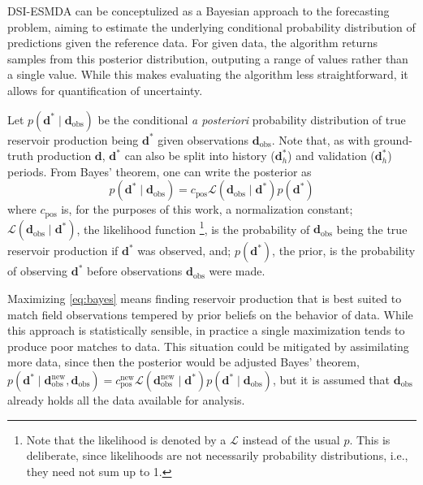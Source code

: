 DSI-ESMDA can be conceptulized as a Bayesian approach to the forecasting problem,
aiming to estimate the underlying conditional probability distribution of 
predictions given the reference data.
%
For given data, the algorithm returns samples from this posterior distribution,
outputing a range of values rather than a single value.
%
While this makes evaluating the algorithm less straightforward, 
it allows for quantification of uncertainty.

Let $p(\mathbf{d}^*\mid \mathbf{d}_\text{obs})$ 
be the conditional \emph{a posteriori} probability distribution
of true reservoir production being $\mathbf{d}^*$ given observations $\mathbf{d}_\text{obs}$.
%
Note that, as with ground-truth production $\mathbf{d}$, 
$\mathbf{d}^*$ can also be split into 
history ($\mathbf{d}^*_h$) and 
validation ($\mathbf{d}^*_h$) periods.  
%
From Bayes' theorem, one can write the posterior as
%
\begin{equation}
    p(\mathbf{d}^*\mid \mathbf{d}_\text{obs}) =
    c_\text{pos} \mathcal{L}(\mathbf{d}_\text{obs} \mid \mathbf{d}^*) p(\mathbf{d}^*)
\label{eq:bayes}
\end{equation}  
%
where $c_\text{pos}$ is, for the purposes of this work, a normalization constant;
$\mathcal{L}(\mathbf{d}_\text{obs}\mid \mathbf{d}^*)$,
the likelihood function%
\footnote{%
    Note that the likelihood is denoted by a $\mathcal{L}$ instead of the usual $p$.
    This is deliberate, since likelihoods are not necessarily probability distributions, 
    i.e., they need not sum up to 1. 
}, 
is the probability of $\mathbf{d}_\text{obs}$ being the true reservoir production 
if $\mathbf{d}^*$ was observed, and;
$p(\mathbf{d}^*)$, the prior, is the probability of observing $\mathbf{d}^*$
before observations $\mathbf{d}_\text{obs}$ were made.

Maximizing \cref{eq:bayes} means finding reservoir production that is 
best suited to match field observations tempered by prior beliefs on the behavior of data.
%    
While this approach is statistically sensible, in practice a single maximization tends to produce poor matches to data.
%
This situation could be mitigated by assimilating more data, 
since then the posterior would be adjusted Bayes' theorem,
$p(\mathbf{d}^* \mid \mathbf{d}^\text{new}_\text{obs}, \mathbf{d}_\text{obs}) = 
c^\text{new}_\text{pos} \mathcal{L}(\mathbf{d}^\text{new}_\text{obs}\mid \mathbf{d}^*) p(\mathbf{d}^* \mid \mathbf{d}_\text{obs})$,
but it is assumed that $\mathbf{d}_\text{obs}$ already holds all the data available for analysis.

